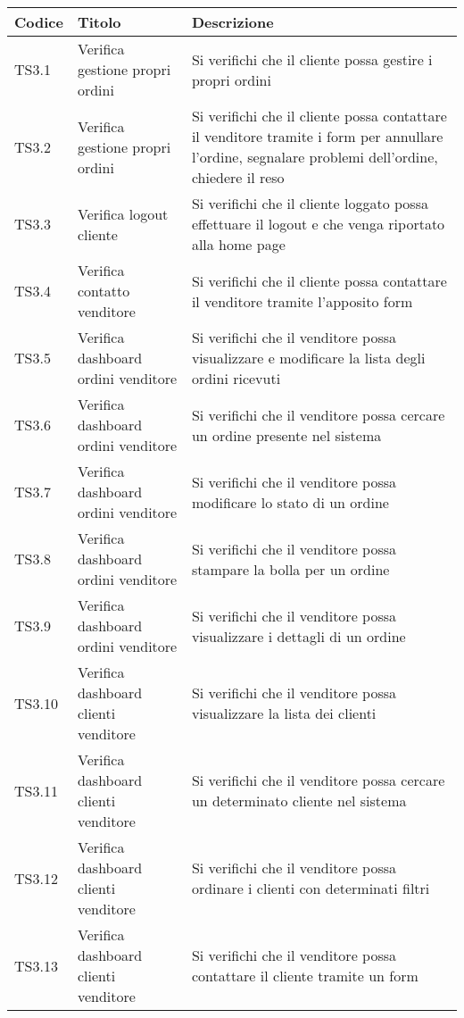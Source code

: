 \begin{center}
	\begin{longtable}{p{1cm}|p{6.85cm}|p{7cm}|}
	\hline
	\rowcolor{lighter-grayer}
	\textbf{Codice} & \textbf{Titolo} & \textbf{Descrizione} \\
	\hline
	\endfirsthead



	\hline
	TS3.1 & Verifica gestione propri ordini & Si verifichi che il cliente possa gestire i propri ordini  \\
	TS3.2 & Verifica gestione propri ordini & Si verifichi che il cliente possa contattare il venditore tramite i form per annullare l'ordine, segnalare problemi dell'ordine, chiedere il reso \\
	TS3.3 & Verifica logout cliente & Si verifichi che il cliente loggato possa effettuare il logout e che venga riportato alla home page \\
	TS3.4 & Verifica contatto venditore & Si verifichi che il cliente possa contattare il venditore tramite l'apposito form  \\
	TS3.5 & Verifica dashboard ordini venditore & Si verifichi che il venditore possa visualizzare e modificare la lista degli ordini ricevuti \\
	TS3.6 & Verifica dashboard ordini venditore & Si verifichi che il venditore possa cercare un ordine presente nel sistema \\
	TS3.7 & Verifica dashboard ordini venditore & Si verifichi che il venditore possa modificare lo stato di un ordine  \\
	TS3.8 & Verifica dashboard ordini venditore & Si verifichi che il venditore possa stampare la bolla per un ordine  \\
	TS3.9 & Verifica dashboard ordini venditore & Si verifichi che il venditore possa visualizzare i dettagli di un ordine \\
	TS3.10 & Verifica dashboard clienti venditore & Si verifichi che il venditore possa visualizzare la lista dei clienti \\
	TS3.11 & Verifica dashboard clienti venditore & Si verifichi che il venditore possa cercare un determinato cliente nel sistema \\
	TS3.12 & Verifica dashboard clienti venditore & Si verifichi che il venditore possa ordinare i clienti con determinati filtri \\
	TS3.13 & Verifica dashboard clienti venditore & Si verifichi che il venditore possa contattare il cliente tramite un form \\

\end{longtable}
\end{center}
